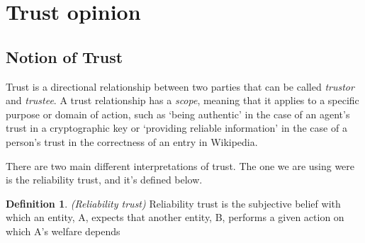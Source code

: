 \documentclass[a4paper,12pt]{article}
\theoremstyle{definition}
\newtheorem{definition}{Definition}[section]
\numberwithin{equation}{section}
\newcommand{\qm}[1]{`#1'}
\newcommand{\red}{\textcolor{red}{red}}
\newcommand{\green}{\textcolor{green(html/cssgreen)}{green}}
\newcommand{\blue}{\textcolor{blue}{blue}}
\begin{document}

%	
%		
%		
%		
%	
%	
%	
%	

\section{Trust opinion}

\subsection{Notion of Trust}

Trust is a directional relationship between two parties that can be called \emph{trustor} and \emph{trustee}. A trust relationship has a \emph{scope}, meaning that it applies to a specific purpose or domain of action, such as \qm{being authentic} in the case of an agent’s trust in a cryptographic key or \qm{providing reliable information} in the case of a person’s trust in the correctness of an entry in Wikipedia.

There are two main different interpretations of trust. The one we are using were is the reliability trust, and it's defined below.

\begin{definition}
	\emph{(Reliability trust)} Reliability trust is the subjective belief with which an entity, A, expects that another entity, B, performs a given action on which A’s welfare depends
\end{definition}
\end{document}
